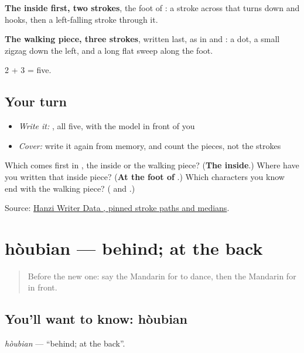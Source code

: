 \begin{quote}
\end{quote}

\textbf{The inside first, two strokes}, the foot of : a stroke across that turns down and hooks, then a left-falling stroke through it.

\textbf{The walking piece, three strokes}, written last, as in  and : a dot, a small zigzag down the left, and a long flat sweep along the foot.

2 + 3 = five.

\subsection*{Your turn}
\begin{itemize}
\raggedright
  \item \emph{Write it:} , all five, with the model in front of you
  \item \emph{Cover:} write it again from memory, and count the pieces, not the strokes
\end{itemize}

\begin{tcolorbox}[breakable,colback=teal!4,colframe=teal!35!black,title={Before you move on}]
Which comes first in , the inside or the walking piece? (\textbf{The inside}.) Where have you written that inside piece? (\textbf{At the foot of }.) Which characters you know end with the walking piece? (\textbf{} and \textbf{}.)

Source: \href{https://raw.githubusercontent.com/chanind/hanzi-writer-data/68d10a4b21150cae5e1ebbd223eed289cf32d90c/data/\%E8\%BE\%B9.json}{Hanzi Writer Data , pinned stroke paths and medians}.
\end{tcolorbox}
\section[hòubian]{hòubian — behind; at the back}

\label{lesson:ZH-C111-houbian}



\begin{quote}
Before the new one: say the Mandarin for to dance, then the Mandarin for in front.
\end{quote}

\subsection*{You'll want to know: hòubian}
\emph{hòubian} — \textquotedblleft{}behind; at the back\textquotedblright{}.

